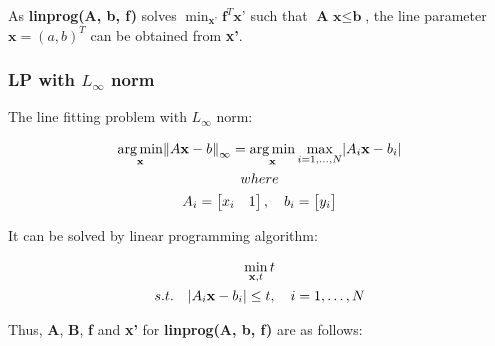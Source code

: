 \documentclass[paper=a4, fontsize=11pt]{scrartcl} %
\numberwithin{equation}{section} %
\numberwithin{figure}{section} %
\numberwithin{table}{section} %
\newcommand{\funcname}[1]{\textbf{#1}}
\renewcommand{\vec}[1]{\mathbf{#1}}
\DeclareMathOperator*{\argmin}{arg\,min} %
\begin{document}
As \funcname{linprog(A, b, f)} solves $\min_{\textbf{x'}} \textbf{f}^{T} \textbf{x'}$ such that $\textbf{A x} \leq \textbf{b}$, the line parameter $\vec{x} = (a, b)^{T}$ can be obtained from \textbf{x'}.

\subsubsection{LP with $L_{\infty}$ norm}

The line fitting problem with $L_{\infty}$ norm: 

\begin{gather*}
\argmin_{\vec{x}} \norm{A\vec{x} - b}_{\infty}  = 
\argmin_{\vec{x}} \max_{i = 1, \dots, N} \abs{A_{i}\vec{x} - b_{i}} \\
where \\
A_{i} = 
\begin{bmatrix}
    x_{i}	&	1 
\end{bmatrix},
\quad b_{i} = 
\begin{bmatrix}
    y_{i}	
\end{bmatrix}
\end{gather*}

\pagebreak

It can be solved by linear programming algorithm:

\begin{gather*}
\min_{\vec{x}, t} t \\
 s.t. \quad \abs{A_{i}\vec{x} - b_{i}} \leq t, \quad i = 1, \dots, N
\end{gather*}

Thus, \textbf{A}, \textbf{B}, \textbf{f} and \textbf{x'} for \funcname{linprog(A, b, f)} are as follows:
\end{document}
